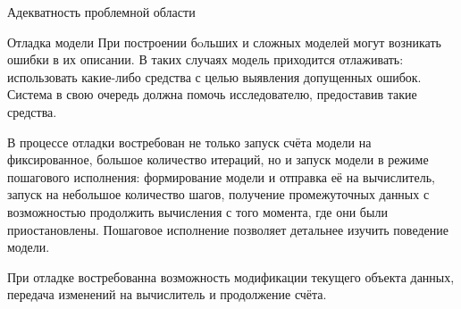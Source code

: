 \documentclass[a4paper,12pt]{extarticle}
\begin{document}
\begin{subsection}{Адекватность проблемной области}
    \begin{subsubsection}{Отладка модели}
        При построении бoльших и сложных моделей могут возникать ошибки в их описании. В таких случаях модель приходится отлаживать: использовать какие-либо средства с целью выявления допущенных ошибок. Система в свою очередь должна помочь исследователю, предоставив такие средства.
        
        В процессе отладки востребован не только запуск счёта модели на фиксированное, большое количество итераций, но и запуск модели в режиме пошагового исполнения: формирование модели и отправка её на вычислитель, запуск на небольшое количество шагов, получение промежуточных данных с возможностью продолжить вычисления с того момента, где они были приостановлены. Пошаговое исполнение позволяет детальнее изучить поведение модели.
        
        При отладке востребованна возможность модификации текущего объекта данных, передача изменений на вычислитель и продолжение счёта.
    \end{subsubsection}

\end{subsection}
\end{document}
